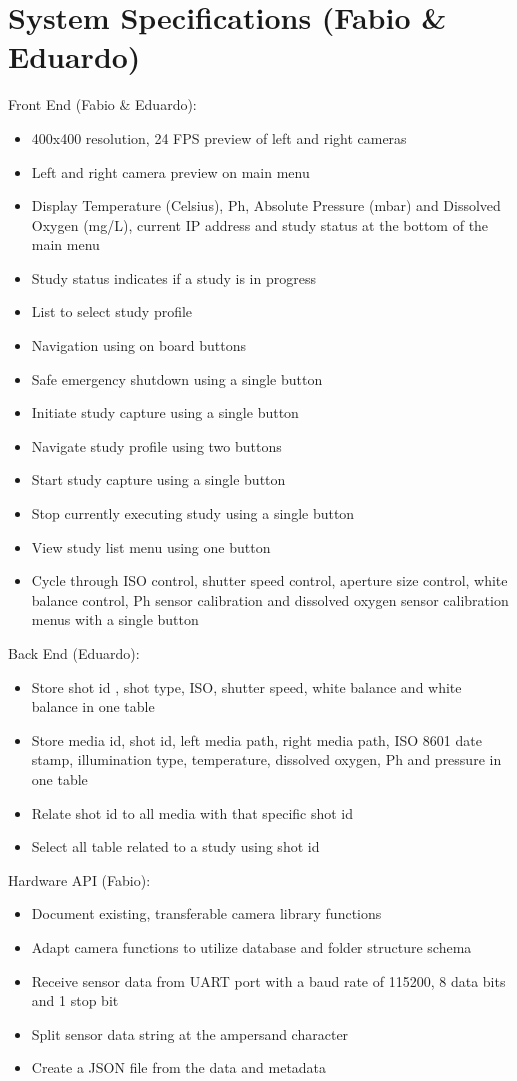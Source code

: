 \section{System Specifications (Fabio \& Eduardo)}
Front End (Fabio \& Eduardo):
\begin{itemize}
	\item 400x400 resolution, 24 FPS preview of left and right cameras
	\item Left and right camera preview on main menu
	\item Display Temperature (Celsius), Ph, Absolute Pressure (mbar) and Dissolved Oxygen (mg/L), current IP address and study status at the bottom of the main menu
	\item Study status indicates if a study is in progress
	\item List to select study profile
	\item Navigation using on board buttons
	\item Safe emergency shutdown using a single button
	\item Initiate study capture using a single button
	\item Navigate study profile using two buttons
	\item Start study capture using a single button
	\item Stop currently executing study using a single button
	\item View study list menu using one button
	\item Cycle through ISO control, shutter speed control, aperture size control, white balance control, Ph sensor calibration and dissolved oxygen sensor calibration menus with a single button
\end{itemize}
Back End (Eduardo):
\begin{itemize}
	\item Store shot id , shot type, ISO, shutter speed, white balance and white balance in one table
	\item Store media id, shot id, left media path, right media path, ISO 8601 date stamp, illumination type, temperature, dissolved oxygen, Ph and pressure in one table
	\item Relate shot id to all media with that specific shot id
	\item Select all table related to a study using shot id
\end{itemize}
Hardware API (Fabio):
\begin{itemize}
	\item Document existing, transferable camera library functions
	\item Adapt camera functions to utilize database and folder structure schema
	\item Receive sensor data from UART port with a baud rate of 115200, 8 data bits and 1 stop bit
	\item Split sensor data string at the ampersand character
	\item Create a JSON file from the data and metadata
\end{itemize}
